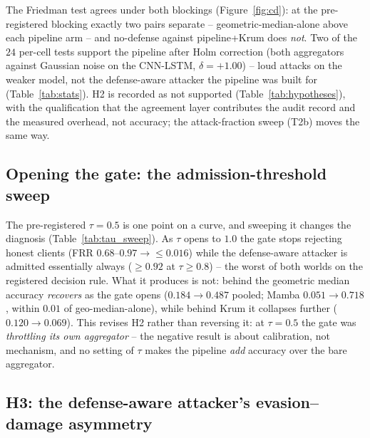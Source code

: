The Friedman test agrees under both blockings (Figure~\ref{fig:cd}): at
the pre-registered blocking exactly two pairs separate --
geometric-median-alone above each pipeline arm -- and no-defense against
pipeline+Krum does \emph{not}. Two of the $24$ per-cell tests support
the pipeline after Holm correction (both aggregators against Gaussian
noise on the CNN-LSTM, $\delta=+1.00$) -- loud attacks on the weaker
model, not the defense-aware attacker the pipeline was built for
(Table~\ref{tab:stats}). H2 is recorded as not supported
(Table~\ref{tab:hypotheses}), with the qualification that the agreement
layer contributes the audit record and the measured overhead, not
accuracy; the attack-fraction sweep (T2b) moves the same way.

\subsection{Opening the gate: the admission-threshold sweep}
\label{sec:res-tau}

The pre-registered $\tau=0.5$ is one point on a curve, and sweeping it
changes the diagnosis (Table~\ref{tab:tau_sweep}). As $\tau$ opens to
$1.0$ the gate stops rejecting honest clients (FRR $0.68$--$0.97
\rightarrow \le 0.016$) while the defense-aware attacker is admitted
essentially always ($\ge 0.92$ at $\tau \ge 0.8$) -- the worst of both
worlds on the registered decision rule. What it produces is not: behind
the geometric median accuracy \emph{recovers} as the gate opens
($0.184 \rightarrow 0.487$ pooled; Mamba $0.051 \rightarrow 0.718$,
within $0.01$ of geo-median-alone), while behind Krum it collapses
further ($0.120 \rightarrow 0.069$). This revises H2 rather than
reversing it: at $\tau=0.5$ the gate was \emph{throttling its own
aggregator} -- the negative result is about calibration, not mechanism,
and no setting of $\tau$ makes the pipeline \emph{add} accuracy over the
bare aggregator.

\subsection{H3: the defense-aware attacker's evasion--damage asymmetry}
\label{sec:res-adaptive}

